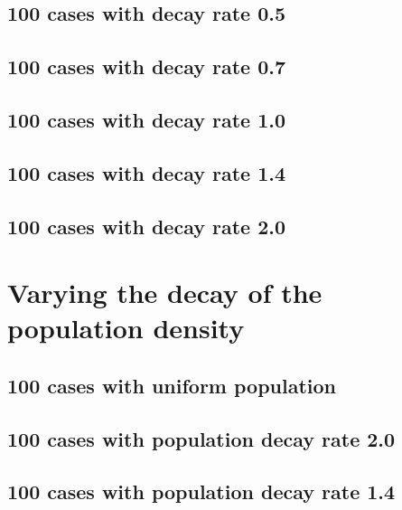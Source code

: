 \subsection{100 cases with decay rate 0.5}


\subsection{100 cases with decay rate 0.7}


\subsection{100 cases with decay rate 1.0}


\subsection{100 cases with decay rate 1.4}


\subsection{100 cases with decay rate 2.0}


\section{Varying the decay of the population density}

\subsection{100 cases with uniform population}


\subsection{100 cases with population decay rate 2.0}


\subsection{100 cases with population decay rate 1.4}


